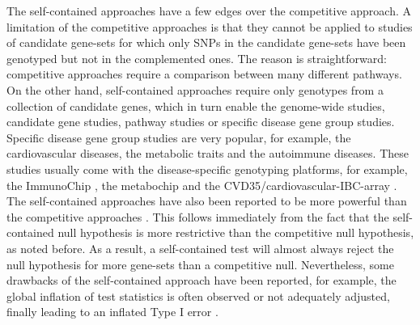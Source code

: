 \documentclass[12pt]{article}
\begin{document}
The self-contained approaches have a few edges over the competitive approach. A limitation of the competitive approaches is that they cannot be applied to studies of candidate gene-sets for
which only SNPs in the candidate gene-sets have been genotyped but not in the complemented ones. The reason is straightforward: competitive approaches require a comparison between many different pathways. On the other hand, self-contained approaches require only genotypes from a collection of candidate genes, which in turn enable the genome-wide studies, candidate gene studies, pathway studies or specific disease gene group studies. Specific disease gene group studies are very popular, for example, the cardiovascular diseases, the metabolic traits and the autoimmune diseases. These studies usually come with the disease-specific genotyping platforms, for example, the ImmunoChip \cite{Cortes2011}, the metabochip \cite{Voight2012} and the CVD35/cardiovascular-IBC-array \cite{Cheng1999,Keating2008}. The self-contained approaches have also been reported to be more powerful than the competitive approaches \cite{Goeman2007}. This follows immediately from the fact that the self-contained null hypothesis is more restrictive than the competitive null hypothesis, as noted before. As a result, a self-contained test will almost always reject the null hypothesis for more gene-sets than a competitive null. Nevertheless, some drawbacks of the self-contained approach have been reported, for example, the global inflation of test statistics is often observed or not adequately adjusted, finally leading to an inflated Type I error \cite{wang2007pathway,Goeman2007,Fridley2010}. 
\end{document}
